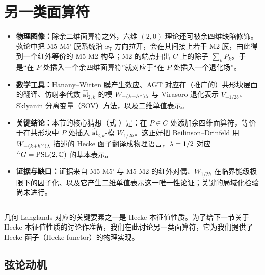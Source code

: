 \section{另一类面算符}

\begin{keytakeaways}
\begin{itemize}
  \item \textbf{物理图像：}除余二维面算符之外，六维 $(2,0)$ 理论还可被余四维缺陷修饰。弦论中把 M5-M5'-膜系统沿 $x_7$ 方向拉开，会在其间接上若干 M2-膜，由此得到一个红外等价的 M5-M2 构型；M2 的端点扫出 $C$ 上的除子 $\sum_k P_k$。于是“在 $P$ 处插入一个余四维面算符”就对应于“在 $P$ 处插入一个退化场”。
  \item \textbf{数学工具：}Hanany--Witten 膜产生效应、AGT 对应在（推广的）共形块层面的翻译、仿射李代数 $\widehat{\mathfrak{sl}}_{2,k}$ 的模 $W_{-(k+h^{\vee})\lambda}$ 与 Virasoro 退化表示 $V_{-1/2b}$、Sklyanin 分离变量（SOV）方法，以及二维单值表示。
  \item \textbf{关键结论：}本节的核心猜想（式 ）是：在 $P\in C$ 处添加余四维面算符，等价于在共形块中 $P$ 处插入 $\widehat{\mathfrak{sl}}_{2,k}$-模 $W_{1/2\hbar}$。这正好把 Beilinson--Drinfeld 用 $W_{-(k+h^{\vee})\lambda}$ 描述的 Hecke 函子翻译成物理语言，$\lambda=1/2$ 对应 ${}^LG=\mathrm{PSL}(2,\mathbb{C})$ 的基本表示。
  \item \textbf{证据与缺口：}证据来自 M5-M5' 与 M5-M2 的红外对偶、$W_{1/2\hbar}$ 在临界能级极限下的因子化、以及它产生二维单值表示这一唯一性论证；关键的局域化检验尚未进行。
\end{itemize}
\end{keytakeaways}

\bigskip
\noindent\rule{\textwidth}{0.6pt}
\bigskip

几何 Langlands 对应的关键要素之一是 Hecke 本征值性质。为了给下一节关于 Hecke 本征值性质的讨论作准备，我们在此讨论另一类面算符，它为我们提供了 Hecke 函子（Hecke functor）的物理实现。

\subsection{弦论动机}

